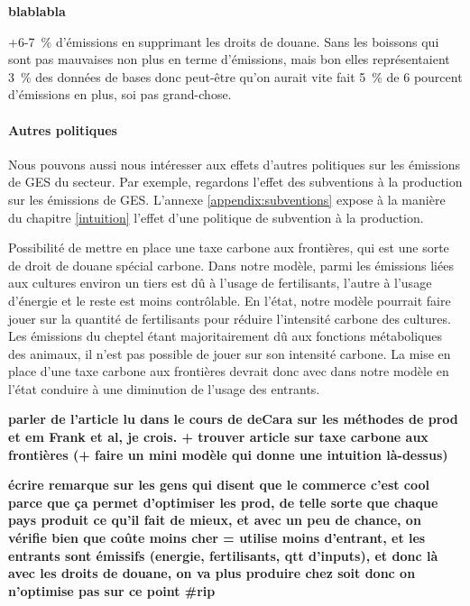 \textbf{blablabla}

+6-7~\% d'émissions en supprimant les droits de douane. Sans les boissons qui sont pas mauvaises non plus en terme d'émissions, mais bon elles représentaient 3~\% des données de bases donc peut-être qu'on aurait vite fait 5~\% de 6 pourcent d'émissions en plus, soi pas grand-chose.


\paragraph{Autres politiques}\label{Sec_subvention}
Nous pouvons aussi nous intéresser aux effets d'autres politiques sur les émissions de GES du secteur. Par exemple, regardons l'effet des subventions à la production sur les émissions de GES. L'annexe \ref{appendix:subventions} expose à la manière du chapitre \ref{intuition} l'effet d'une politique de subvention à la production.

Possibilité de mettre en place une taxe carbone aux frontières, qui est une sorte de droit de douane spécial carbone. Dans notre modèle, parmi les émissions liées aux cultures environ un tiers est dû à l'usage de fertilisants, l'autre à l'usage d'énergie et le reste est moins contrôlable. En l'état, notre modèle pourrait faire jouer sur la quantité de fertilisants pour réduire l'intensité carbone des cultures. Les émissions du cheptel étant majoritairement dû aux fonctions métaboliques des animaux, il n'est pas possible de jouer sur son intensité carbone. La mise en place d'une taxe carbone aux frontières devrait donc avec dans notre modèle en l'état conduire à une diminution de l'usage des entrants.

\textbf{parler de l'article lu dans le cours de deCara sur les méthodes de prod et em Frank et al, je crois. + trouver article sur taxe carbone aux frontières (+ faire un mini modèle qui donne une intuition là-dessus)}


\textbf{écrire remarque sur les gens qui disent que le commerce c'est cool parce que ça permet d'optimiser les prod, de telle sorte que chaque pays produit ce qu'il fait de mieux, et avec un peu de chance, on vérifie bien que coûte moins cher = utilise moins d'entrant, et les entrants sont émissifs (energie, fertilisants, qtt d'inputs), et donc là avec les droits de douane, on va plus produire chez soit donc on n'optimise pas sur ce point \#rip}